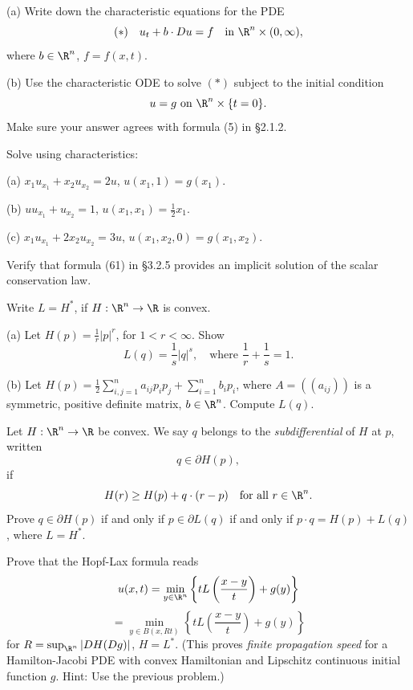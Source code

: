 \begin{exercise}
(a) Write down the characteristic equations for the PDE
$$(*)  \quad u_t + b \cdot Du = f \quad \text{in } \R^n \times (0,\infty),$$
where $b \in \R^n$, $f = f(x,t)$.

(b) Use the characteristic ODE to solve $(*)$ subject to the initial condition
$$u = g \text{ on } \R^n \times \{t = 0\}.$$
Make sure your answer agrees with formula (5) in \S2.1.2.
\end{exercise}

\begin{exercise}
Solve using characteristics:

(a) $x_1 u_{x_1} + x_2 u_{x_2} = 2u$, $u(x_1, 1) = g(x_1)$.

(b) $uu_{x_1} + u_{x_2} = 1$, $u(x_1, x_1) = \frac{1}{2}x_1$.

(c) $x_1 u_{x_1} + 2x_2 u_{x_2} = 3u$, $u(x_1, x_2, 0) = g(x_1, x_2)$.
\end{exercise}

\begin{exercise}
Verify that formula (61) in \S3.2.5 provides an implicit solution of the scalar conservation law.
\end{exercise}

\begin{exercise}
Write $L = H^*$, if $H : \R^n \to \R$ is convex.

(a) Let $H(p) = \frac{1}{r}|p|^r$, for $1 < r < \infty$. Show
$$L(q) = \frac{1}{s}|q|^s, \quad \text{where } \frac{1}{r} + \frac{1}{s} = 1.$$

(b) Let $H(p) = \frac{1}{2}\sum_{i,j=1}^n a_{ij}p_i p_j + \sum_{i=1}^n b_i p_i$, where $A = ((a_{ij}))$ is a symmetric, positive definite matrix, $b \in \R^n$. Compute $L(q)$.
\end{exercise}

\begin{exercise}
Let $H : \R^n \to \R$ be convex. We say $q$ belongs to the \textit{subdifferential} of $H$ at $p$, written
$$q \in \partial H(p),$$
if
$$H(r) \geq H(p) + q \cdot (r - p) \quad \text{for all } r \in \R^n.$$
Prove $q \in \partial H(p)$ if and only if $p \in \partial L(q)$ if and only if $p \cdot q = H(p) + L(q)$, where $L = H^*$.
\end{exercise}

\begin{exercise}
Prove that the Hopf-Lax formula reads
$$u(x,t) = \min_{y \in \R^n} \left\{ tL\left(\frac{x-y}{t}\right) + g(y)\right\}$$
$$= \min_{y \in B(x, Rt)} \left\{ tL\left(\frac{x-y}{t}\right) + g(y)\right\}$$
for $R = \sup_{\R^n} |DH(Dg)|$, $H = L^*$. (This proves \textit{finite propagation speed} for a Hamilton-Jacobi PDE with convex Hamiltonian and Lipschitz continuous initial function $g$. Hint: Use the previous problem.)
\end{exercise}

